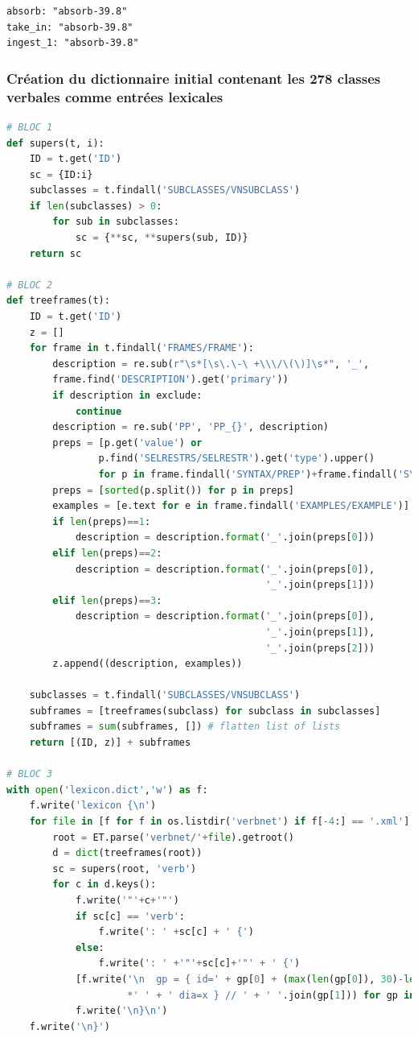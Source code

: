 \begin{lstlisting}[language=XML]
absorb: "absorb-39.8"
take_in: "absorb-39.8"
ingest_1: "absorb-39.8"
\end{lstlisting}

\subsubsection{Création du dictionnaire initial contenant les 278 classes verbales comme entrées lexicales}

\begin{lstlisting}[language=Python, caption = Script pour générer `lexicon.dict']
# BLOC 1
def supers(t, i):
    ID = t.get('ID')
    sc = {ID:i}
    subclasses = t.findall('SUBCLASSES/VNSUBCLASS')
    if len(subclasses) > 0:
        for sub in subclasses:
            sc = {**sc, **supers(sub, ID)}
    return sc
		
# BLOC 2
def treeframes(t):
    ID = t.get('ID')
    z = []
    for frame in t.findall('FRAMES/FRAME'):
        description = re.sub(r"\s*[\s\.\-\ +\\\/\(\)]\s*", '_', 
        frame.find('DESCRIPTION').get('primary'))
        if description in exclude:
            continue
        description = re.sub('PP', 'PP_{}', description)
        preps = [p.get('value') or 
                p.find('SELRESTRS/SELRESTR').get('type').upper() 
                for p in frame.findall('SYNTAX/PREP')+frame.findall('SYNTAX/LEX')]
        preps = [sorted(p.split()) for p in preps]     
        examples = [e.text for e in frame.findall('EXAMPLES/EXAMPLE')]
        if len(preps)==1:
            description = description.format('_'.join(preps[0]))
        elif len(preps)==2:
            description = description.format('_'.join(preps[0]),
                                             '_'.join(preps[1]))
        elif len(preps)==3:
            description = description.format('_'.join(preps[0]), 
                                             '_'.join(preps[1]), 
                                             '_'.join(preps[2]))
        z.append((description, examples))
        
    subclasses = t.findall('SUBCLASSES/VNSUBCLASS')
    subframes = [treeframes(subclass) for subclass in subclasses]
    subframes = sum(subframes, []) # flatten list of lists
    return [(ID, z)] + subframes
		
# BLOC 3
with open('lexicon.dict','w') as f:
    f.write('lexicon {\n')
    for file in [f for f in os.listdir('verbnet') if f[-4:] == '.xml']:
        root = ET.parse('verbnet/'+file).getroot()       
        d = dict(treeframes(root))
        sc = supers(root, 'verb')
        for c in d.keys():
            f.write('"'+c+'"')
            if sc[c] == 'verb':
                f.write(': ' +sc[c] + ' {')
            else:
                f.write(': ' +'"'+sc[c]+'"' + ' {')
            [f.write('\n  gp = { id=' + gp[0] + (max(len(gp[0]), 30)-len(gp[0]))
                     *' ' + ' dia=x } // ' + ' '.join(gp[1])) for gp in d[c]]
            f.write('\n}\n')
    f.write('\n}')
\end{lstlisting}

